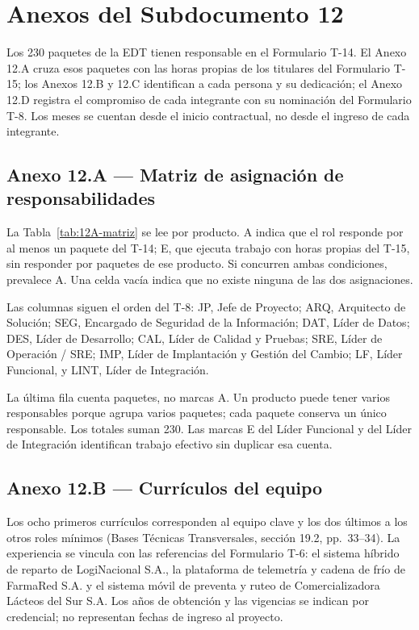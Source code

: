 \chapter{Anexos del Subdocumento 12}

Los 230 paquetes de la EDT tienen responsable en el Formulario T-14. El Anexo 12.A cruza esos paquetes con las horas propias de los titulares del Formulario T-15; los Anexos 12.B y 12.C identifican a cada persona y su dedicación; el Anexo 12.D registra el compromiso de cada integrante con su nominación del Formulario T-8. Los meses se cuentan desde el inicio contractual, no desde el ingreso de cada integrante.

\section{Anexo 12.A — Matriz de asignación de responsabilidades}

La Tabla~\ref{tab:12A-matriz} se lee por producto. A indica que el rol responde por al menos un paquete del T-14; E, que ejecuta trabajo con horas propias del T-15, sin responder por paquetes de ese producto. Si concurren ambas condiciones, prevalece A. Una celda vacía indica que no existe ninguna de las dos asignaciones.

Las columnas siguen el orden del T-8: JP, Jefe de Proyecto; ARQ, Arquitecto de Solución; SEG, Encargado de Seguridad de la Información; DAT, Líder de Datos; DES, Líder de Desarrollo; CAL, Líder de Calidad y Pruebas; SRE, Líder de Operación / SRE; IMP, Líder de Implantación y Gestión del Cambio; LF, Líder Funcional, y LINT, Líder de Integración.

\begin{anexohorizontal}
\setlength{\textwidth}{\linewidth}

La última fila cuenta paquetes, no marcas A. Un producto puede tener varios responsables porque agrupa varios paquetes; cada paquete conserva un único responsable. Los totales suman 230. Las marcas E del Líder Funcional y del Líder de Integración identifican trabajo efectivo sin duplicar esa cuenta.
\end{anexohorizontal}

\section{Anexo 12.B — Currículos del equipo}

Los ocho primeros currículos corresponden al equipo clave y los dos últimos a los otros roles mínimos (Bases Técnicas Transversales, sección 19.2, pp.~33--34). La experiencia se vincula con las referencias del Formulario T-6: el sistema híbrido de reparto de LogiNacional S.A., la plataforma de telemetría y cadena de frío de FarmaRed S.A. y el sistema móvil de preventa y ruteo de Comercializadora Lácteos del Sur S.A. Los años de obtención y las vigencias se indican por credencial; no representan fechas de ingreso al proyecto.

